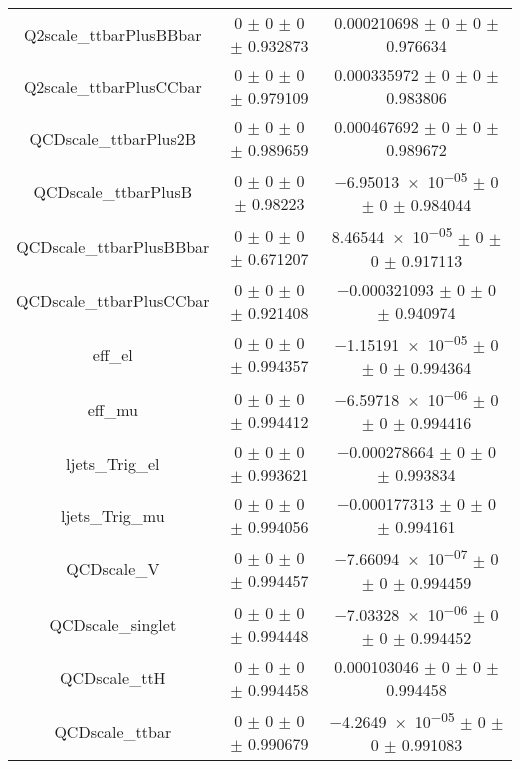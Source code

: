\begin{table}
\begin{tabular}{ccc}
Q2scale\_ttbarPlusBBbar & \num{0} $\pm$ \num{0} $\pm$ \num{0} $\pm$ \num{0.932873} & \num{0.000210698} $\pm$ \num{0} $\pm$ \num{0} $\pm$ \num{0.976634}\\
Q2scale\_ttbarPlusCCbar & \num{0} $\pm$ \num{0} $\pm$ \num{0} $\pm$ \num{0.979109} & \num{0.000335972} $\pm$ \num{0} $\pm$ \num{0} $\pm$ \num{0.983806}\\
QCDscale\_ttbarPlus2B & \num{0} $\pm$ \num{0} $\pm$ \num{0} $\pm$ \num{0.989659} & \num{0.000467692} $\pm$ \num{0} $\pm$ \num{0} $\pm$ \num{0.989672}\\
QCDscale\_ttbarPlusB & \num{0} $\pm$ \num{0} $\pm$ \num{0} $\pm$ \num{0.98223} & \num{-6.95013e-05} $\pm$ \num{0} $\pm$ \num{0} $\pm$ \num{0.984044}\\
QCDscale\_ttbarPlusBBbar & \num{0} $\pm$ \num{0} $\pm$ \num{0} $\pm$ \num{0.671207} & \num{8.46544e-05} $\pm$ \num{0} $\pm$ \num{0} $\pm$ \num{0.917113}\\
QCDscale\_ttbarPlusCCbar & \num{0} $\pm$ \num{0} $\pm$ \num{0} $\pm$ \num{0.921408} & \num{-0.000321093} $\pm$ \num{0} $\pm$ \num{0} $\pm$ \num{0.940974}\\
eff\_el & \num{0} $\pm$ \num{0} $\pm$ \num{0} $\pm$ \num{0.994357} & \num{-1.15191e-05} $\pm$ \num{0} $\pm$ \num{0} $\pm$ \num{0.994364}\\
eff\_mu & \num{0} $\pm$ \num{0} $\pm$ \num{0} $\pm$ \num{0.994412} & \num{-6.59718e-06} $\pm$ \num{0} $\pm$ \num{0} $\pm$ \num{0.994416}\\
ljets\_Trig\_el & \num{0} $\pm$ \num{0} $\pm$ \num{0} $\pm$ \num{0.993621} & \num{-0.000278664} $\pm$ \num{0} $\pm$ \num{0} $\pm$ \num{0.993834}\\
ljets\_Trig\_mu & \num{0} $\pm$ \num{0} $\pm$ \num{0} $\pm$ \num{0.994056} & \num{-0.000177313} $\pm$ \num{0} $\pm$ \num{0} $\pm$ \num{0.994161}\\
QCDscale\_V & \num{0} $\pm$ \num{0} $\pm$ \num{0} $\pm$ \num{0.994457} & \num{-7.66094e-07} $\pm$ \num{0} $\pm$ \num{0} $\pm$ \num{0.994459}\\
QCDscale\_singlet & \num{0} $\pm$ \num{0} $\pm$ \num{0} $\pm$ \num{0.994448} & \num{-7.03328e-06} $\pm$ \num{0} $\pm$ \num{0} $\pm$ \num{0.994452}\\
QCDscale\_ttH & \num{0} $\pm$ \num{0} $\pm$ \num{0} $\pm$ \num{0.994458} & \num{0.000103046} $\pm$ \num{0} $\pm$ \num{0} $\pm$ \num{0.994458}\\
QCDscale\_ttbar & \num{0} $\pm$ \num{0} $\pm$ \num{0} $\pm$ \num{0.990679} & \num{-4.2649e-05} $\pm$ \num{0} $\pm$ \num{0} $\pm$ \num{0.991083}\\

\end{tabular}
\end{table}
